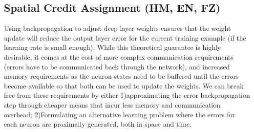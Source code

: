 \documentclass[journal,onecolumn,11pt]{IEEEtran}
\begin{document}
\subsection{Spatial Credit Assignment (HM, EN, FZ)}
Using backpropagation to adjust deep layer weights ensures that the weight update  will reduce the output layer error for the current training example (if the learning rate is small enough). While this theoretical guarantee is highly desirable, it comes at the cost of more complex communication requirements (errors have to be communicated back through the network), and increased memory requirements as the neuron states need to be buffered until the errors become available so that both can be used to update the weights. We can break free from these requirements by either 1)approximating the error backpropagation step through cheaper means that incur less memory and communication overhead; 2)Formulating an alternative learning problem where the errors for each neuron are proximally generated, both in space and time.
\end{document}
